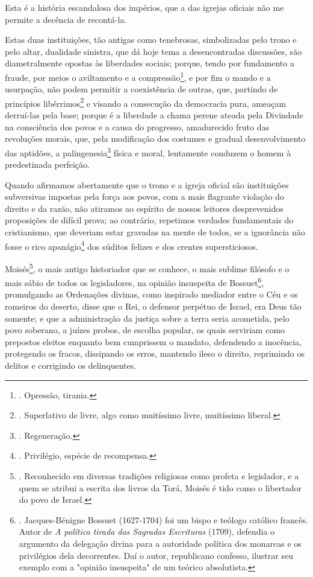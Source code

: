 Esta é a história escandalosa dos impérios, que a das igrejas oficiais
não me permite a decência de recontá-la.

Estas duas instituições, tão antigas como tenebrosas, simbolizadas pelo
trono e pelo altar, dualidade sinistra, que dá hoje tema a
desencontradas discussões, são diametralmente opostas às liberdades
sociais; porque, tendo por fundamento a fraude, por meios o aviltamento
e a compressão\footnote{. Opressão, tirania.}, e por fim o mando e a
usurpação, não podem permitir a coexistência de outras, que, partindo de
princípios libérrimos\footnote{. Superlativo de livre, algo como
  muitíssimo livre, muitíssimo liberal.} e visando a consecução da
democracia pura, ameaçam derruí-las pela base; porque é a liberdade a
chama perene ateada pela Divindade na consciência dos povos e a causa do
progresso, amadurecido fruto das revoluções morais, que, pela
modificação dos costumes e gradual desenvolvimento das aptidões, a
palingenesia\footnote{. Regeneração.} física e moral, lentamente
conduzem o homem à predestinada perfeição.

Quando afirmamos abertamente que o trono e a igreja oficial são
instituições subversivas impostas pela força aos povos, com a mais
flagrante violação do direito e da razão, não atiramos ao espírito de
nossos leitores desprevenidos proposições de difícil prova; ao
contrário, repetimos verdades fundamentais do cristianismo, que deveriam
estar gravadas na mente de todos, se a ignorância não fosse o rico
apanágio\footnote{. Privilégio, espécie de recompensa.} dos súditos
felizes e dos crentes supersticiosos.

Moisés\footnote{. Reconhecido em diversas tradições religiosas como
  profeta e legislador, e a quem se atribui a escrita dos livros da
  Torá, Moisés é tido como o libertador do povo de Israel.}, o mais
antigo historiador que se conhece, o mais sublime filósofo e o mais
sábio de todos os legisladores, na opinião insuspeita de
Bossuet\footnote{. Jacques-Bénigne Bossuet (1627-1704) foi um bispo e
  teólogo católico francês. Autor de \emph{A política tirada das
  Sagradas Escrituras} (1709), defendia o argumento da delegação divina
  para a autoridade política dos monarcas e os privilégios dela
  decorrentes. Daí o autor, republicano confesso, ilustrar seu exemplo
  com a "opinião insuspeita" de um teórico absolutista.}, promulgando as
Ordenações divinas, como inspirado mediador entre o Céu e os romeiros do
deserto, disse que o Rei, o defensor perpétuo de Israel, era Deus tão
somente; e que a administração da justiça sobre a terra seria acometida,
pelo povo soberano, a juízes probos, de escolha popular, os quais
serviriam como prepostos eleitos enquanto bem cumprissem o mandato,
defendendo a inocência, protegendo os fracos, dissipando os erros,
mantendo ileso o direito, reprimindo os delitos e corrigindo os
delinquentes.

